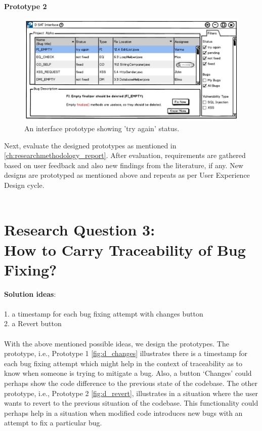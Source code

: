 \textbf{Prototype 2}

\begin{figure}[hbt!]
	\centering
	\includegraphics[width=\linewidth]{figures/d_tryagain}
	\caption{An interface prototype showing 'try again' status.}
	\label{fig:d_tryagain}
\end{figure}

Next, evaluate the designed prototypes as mentioned in \autoref{ch:researchmethodology_report}. After evaluation, requirements are gathered based on user feedback and also new findings from the literature, if any. New designs are prototyped as mentioned above and repeats as per User Experience Design cycle. \\ \\

\section{Research Question 3:  \\ How to Carry Traceability of Bug Fixing?}

\textbf{Solution ideas}: \\ \\
1. a timestamp for each bug fixing attempt with changes button \\
2. a Revert button \\ \\

With the above mentioned possible ideas, we design the prototypes. The prototype, i.e., Prototype 1 \ref{fig:d_changes} illustrates there is a timestamp for each bug fixing attempt which might help in the context of traceability as to know when someone is trying to mitigate a bug. Also, a button ‘Changes’ could perhaps show the code difference to the previous state of the codebase. The other prototype, i.e., Prototype 2 \ref{fig:d_revert}, illustrates in a situation where the user wants to revert to the previous situation of the codebase. This functionality could perhaps help in a situation when modified code introduces new bugs with an attempt to fix a particular bug. \\ \\

